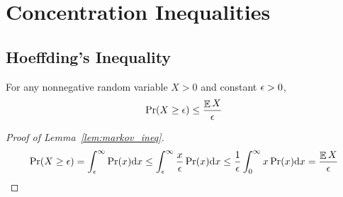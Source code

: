 \section{Concentration Inequalities}

\subsection{Hoeffding's Inequality}

\begin{lemma}\label{lem:markov_ineq}
  For any nonnegative random variable $X > 0$ and constant $\epsilon > 0$,
  $$\Pr(X \ge \epsilon) \le \frac{\mathop{\mathbb{E}}{X}}{\epsilon}$$
\end{lemma}

\begin{proof}[Proof of Lemma~\ref{lem:markov_ineq}]
  \[
    \Pr(X \ge \epsilon) =  \int_{\epsilon}^{\infty} \Pr(x) {\mathrm{d}x}
    \le \int_{\epsilon}^{\infty} \frac{x}{\epsilon} \Pr(x) {\mathrm{d}x}
    \le \frac{1}{\epsilon} \int_{0}^{\infty} x \Pr(x) {\mathrm{d}x}
    = \frac{\mathop{\mathbb{E}}{X}}{\epsilon}
    \qedhere
  \]
\end{proof}